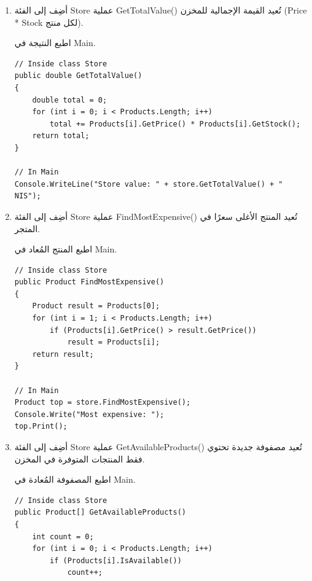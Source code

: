 \documentclass[14pt]{extarticle}
\begin{document}
\begin{enumerate}
\item
أضِف إلى الفئة \textenglish{Store} عملية \textenglish{GetTotalValue()} تُعيد
القيمة الإجمالية للمخزن (\textenglish{Price * Stock} لكل منتج).

اطبع النتيجة في \textenglish{Main}.

\ifwithsols
\begin{boxSolution}
\begin{english}
{\small
\begin{verbatim}
// Inside class Store
public double GetTotalValue()
{
    double total = 0;
    for (int i = 0; i < Products.Length; i++)
        total += Products[i].GetPrice() * Products[i].GetStock();
    return total;
}

// In Main
Console.WriteLine("Store value: " + store.GetTotalValue() + " NIS");
\end{verbatim}
}
\end{english}
\end{boxSolution}
\clearpage
\fi

\item
أضِف إلى الفئة \textenglish{Store} عملية \textenglish{FindMostExpensive()}
تُعيد المنتج الأغلى سعرًا في المتجر.

اطبع المنتج المُعاد في \textenglish{Main}.

\ifwithsols
\begin{boxSolution}
\begin{english}
{\small
\begin{verbatim}
// Inside class Store
public Product FindMostExpensive()
{
    Product result = Products[0];
    for (int i = 1; i < Products.Length; i++)
        if (Products[i].GetPrice() > result.GetPrice())
            result = Products[i];
    return result;
}

// In Main
Product top = store.FindMostExpensive();
Console.Write("Most expensive: ");
top.Print();
\end{verbatim}
}
\end{english}
\end{boxSolution}
\clearpage
\fi

\item
أضِف إلى الفئة \textenglish{Store} عملية \textenglish{GetAvailableProducts()}
تُعيد مصفوفة جديدة تحتوي فقط المنتجات المتوفرة في المخزن.

اطبع المصفوفة المُعادة في \textenglish{Main}.

\ifwithsols
\begin{boxSolution}
\begin{english}
{\small
\begin{verbatim}
// Inside class Store
public Product[] GetAvailableProducts()
{
    int count = 0;
    for (int i = 0; i < Products.Length; i++)
        if (Products[i].IsAvailable())
            count++;


\end{verbatim}}
\end{english}
\end{boxSolution}
\end{enumerate}
\end{document}
